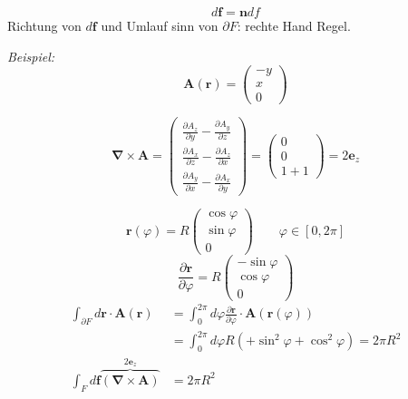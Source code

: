 \documentclass[titlepage,11pt,a4paper,ngerman]{report}
\newcommand{\ob}[1]{\overbrace{#1}}
\renewcommand{\vec}[1]{\boldsymbol{#1}}
\begin{document}


$$d\vec{f} = \vec{n} df$$
Richtung von $d\vec{f}$ und Umlauf sinn von $\partial F$: rechte Hand Regel.

\emph{Beispiel:}
\begin{equation*}
\vec{A}(\vec{r}) = \begin{pmatrix}
-y \\ x \\ 0
\end{pmatrix}
\end{equation*}






\begin{equation*}
\vec{\nabla} \times \vec{A} = \begin{pmatrix}
\frac{\partial A_z}{\partial y} - \frac{\partial A_y}{\partial z} \\
\frac{\partial A_x}{\partial z} - \frac{\partial A_z}{\partial x} \\
\frac{\partial A_y}{\partial x} - \frac{\partial A_x}{\partial y}
\end{pmatrix} = \begin{pmatrix}
0 \\ 0 \\ 1 + 1
\end{pmatrix} = 2 \vec{e}_z
\end{equation*}







\begin{equation*}
\vec{r}(\varphi) = R \begin{pmatrix}
\cos \varphi \\ \sin \varphi \\ 0
\end{pmatrix} \qquad \varphi \in [0,2\pi]
\end{equation*}
\begin{equation*}
\frac{\partial \vec{r}}{\partial \varphi} = R \begin{pmatrix}
- \sin \varphi \\ \cos \varphi \\ 0
\end{pmatrix}
\end{equation*}
\begin{align*}
\int_{\partial F} d \vec{r} \cdot \vec{A}(\vec{r}) &= \int_{0}^{2 \pi} d \varphi \frac{\partial \vec{r}}{\partial \varphi} \cdot \vec{A}( \vec{r} ( \varphi)) \\
&= \int_{0}^{2 \pi} d \varphi R ( + \sin^2 \varphi + \cos^2 \varphi) = 2 \pi R^2\\
\int_F d\vec{f} \ob{\left(\vec{\nabla} \times  \vec{A}\right)}^{2 \vec{e}_z} &= 2 \pi R^2
\end{align*}
\end{document}
